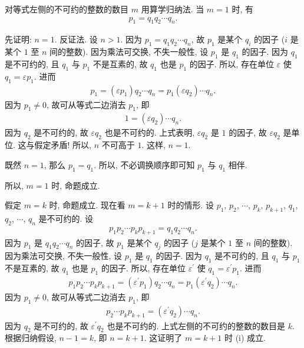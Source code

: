\begin{pf}
    对等式左侧的不可约的整数的数目 $m$ 用算学归纳法. 当 $m = 1$ 时, 有
    \begin{align*}
        p_1 = q_1 q_2 \cdots q_n.
    \end{align*}

    先证明: $n = 1$. 反证法. 设 $n > 1$. 因为 $p_1 = q_1 q_2 \cdots q_n$, 故 $p_1$ 是某个 $q_i$ 的因子 ($i$ 是某个 $1$ 至 $n$ 间的整数). 因为乘法可交换, 不失一般性, 设 $p_1$ 是 $q_1$ 的因子. 因为 $q_1$ 是不可约的, 且 $q_1$ 与 $p_1$ 不是互素的, 故 $q_1$ 也是 $p_1$ 的因子. 所以, 存在单位 $\varepsilon$ 使 $q_1 = \varepsilon p_1$. 进而
    \begin{align*}
        p_1 = (\varepsilon p_1) q_2 \cdots q_n = p_1 (\varepsilon q_2) \cdots q_n.
    \end{align*}
    因为 $p_1 \neq 0$, 故可从等式二边消去 $p_1$, 即
    \begin{align*}
        1 = (\varepsilon q_2) \cdots q_n.
    \end{align*}
    因为 $q_2$ 是不可约的, 故 $\varepsilon q_2$ 也是不可约的. 上式表明, $\varepsilon q_2$ 是 $1$ 的因子, 故 $\varepsilon q_2$ 是单位. 这与假定矛盾! 所以, $n$ 不可高于 $1$. 这样, $n = 1$.

    既然 $n = 1$, 那么 $p_1 = q_1$. 所以, 不必调换顺序即可知 $p_1$ 与 $q_1$ 相伴.

    所以, $m=1$ 时, 命题成立.

    假定 $m=k$ 时, 命题成立. 现在看 $m=k+1$ 时的情形. 设 $p_1$, $p_2$, $\cdots$, $p_k$, $p_{k+1}$, $q_1$, $q_2$, $\cdots$, $q_n$ 是不可约的. 设
    \begin{align*}
        p_1 p_2 \cdots p_k p_{k+1} = q_1 q_2 \cdots q_n.
    \end{align*}
    因为 $p_1$ 是 $q_1 q_2 \cdots q_n$ 的因子, 故 $p_1$ 是某个 $q_j$ 的因子 ($j$ 是某个 $1$ 至 $n$ 间的整数). 因为乘法可交换, 不失一般性, 设 $p_1$ 是 $q_1$ 的因子. 因为 $q_1$ 是不可约的, 且 $q_1$ 与 $p_1$ 不是互素的, 故 $q_1$ 也是 $p_1$ 的因子. 所以, 存在单位 $\varepsilon^{\prime}$ 使 $q_1 = \varepsilon^{\prime} p_1$. 进而
    \begin{align*}
        p_1 p_2 \cdots p_k p_{k+1} = (\varepsilon^{\prime} p_1) q_2 \cdots q_n = p_1 (\varepsilon^{\prime} q_2) \cdots q_n.
    \end{align*}
    因为 $p_1 \neq 0$, 故可从等式二边消去 $p_1$, 即
    \begin{align*}
        p_2 \cdots p_k p_{k+1} = (\varepsilon^{\prime} q_2) \cdots q_n.
    \end{align*}
    因为 $q_2$ 是不可约的, 故 $\varepsilon^{\prime} q_2$ 也是不可约的. 上式左侧的不可约的整数的数目是 $k$. 根据归纳假设, $n-1 = k$, 即 $n = k+1$. 这证明了 $m=k+1$ 时 (i) 成立.


\end{pf}
